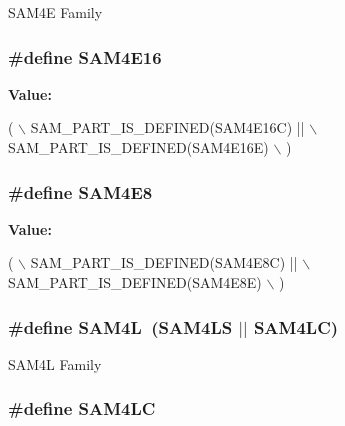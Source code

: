 S\-A\-M4\-E Family \hypertarget{group__sam__part__macros__group_ga7e756ab3c18b6c54de1d7f376e13eaa3}{
\subsubsection[{S\-A\-M4\-E16}]{\setlength{\rightskip}{0pt plus 5cm}\#define S\-A\-M4\-E16}}\label{group__sam__part__macros__group_ga7e756ab3c18b6c54de1d7f376e13eaa3}
{\bfseries Value\-:}
\begin{DoxyCode}
( \(\backslash\)
                SAM\_PART\_IS\_DEFINED(SAM4E16C) || \(\backslash\)
                SAM\_PART\_IS\_DEFINED(SAM4E16E) \(\backslash\)
                )
\end{DoxyCode}
\hypertarget{group__sam__part__macros__group_ga698232ea02e61922d22e02b339796a50}{
\subsubsection[{S\-A\-M4\-E8}]{\setlength{\rightskip}{0pt plus 5cm}\#define S\-A\-M4\-E8}}\label{group__sam__part__macros__group_ga698232ea02e61922d22e02b339796a50}
{\bfseries Value\-:}
\begin{DoxyCode}
( \(\backslash\)
                SAM\_PART\_IS\_DEFINED(SAM4E8C) || \(\backslash\)
                SAM\_PART\_IS\_DEFINED(SAM4E8E) \(\backslash\)
                )
\end{DoxyCode}
\hypertarget{group__sam__part__macros__group_gabf4b4fa802cbb57480225dd3c8f7a41b}{
\subsubsection[{S\-A\-M4\-L}]{\setlength{\rightskip}{0pt plus 5cm}\#define S\-A\-M4\-L~(S\-A\-M4\-L\-S $|$$|$ S\-A\-M4\-L\-C)}}\label{group__sam__part__macros__group_gabf4b4fa802cbb57480225dd3c8f7a41b}
S\-A\-M4\-L Family \hypertarget{group__sam__part__macros__group_gaff053c1dc2a1aaf1e97428da4cb49704}{
\subsubsection[{S\-A\-M4\-L\-C}]{\setlength{\rightskip}{0pt plus 5cm}\#define S\-A\-M4\-L\-C}}\label{group__sam__part__macros__group_gaff053c1dc2a1aaf1e97428da4cb49704}
